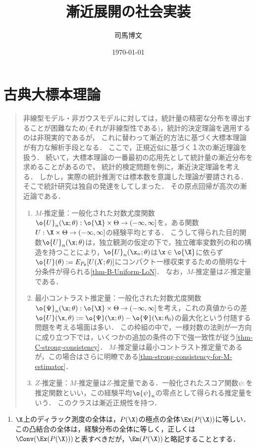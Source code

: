 \documentclass[uplatex,dvipdfmx]{jsreport}
\title{漸近展開の社会実装}
\author{司馬博文}
\date{\today}
\begin{document}
\tableofcontents


\chapter{古典大標本理論}

\begin{quotation}
    非線型モデル・非ガウスモデルに対しては，統計量の精密な分布を導出することが困難なため(それが非線型性である)，統計的決定理論を適用するのは非現実的であるが，
    これに替わって漸近的方法に基づく大標本理論が有力な解析手段となる．
    ここで，正規近似に基づく１次の漸近理論を扱う．
    続いて，大標本理論の一番最初の応用先として統計量の漸近分布を求めることがあるので，
    統計的検定問題を例に，漸近決定理論を考える．
    しかし，実際の統計推測では標本数を意識した理論が要請される．
    そこで統計研究は独自の発達をしてしまった．
    その原点回帰が高次の漸近論である．
    \begin{enumerate}
        \item $M$-推定量：一般化された対数尤度関数$\o{U}_n(\x;\theta):\o{\X}\times\Theta\to(-\infty,\infty]$を，ある関数$U:\X\times\Theta\to(-\infty,\infty]$の経験平均とする．
        こうして得られた目的関数$\o{U}_n(\x;\theta)$は，独立観測の仮定の下で，独立確率変数列の和の構造を持つことにより，$\o{U}_n(\x_n;\theta)$は$\x\in\o{\X}$に依らず$\o{U}(\theta):=E_{P_\theta}[U(X;\theta)]$にコンパクト一様収束するための簡明な十分条件が得られる\ref{thm-B-Uniform-LoN}．
        なお，$M$-推定量は$Z$-推定量である．
        \item 最小コントラスト推定量：一般化された対数尤度関数$\o{\Psi}_n(\x;\theta):\o{\X}\times\Theta\to(-\infty,\infty]$を考え，これの真値からの差$\o{U}(\x,\theta):=\o{\Psi}(\x;\theta)-\o{\Psi}(\x;\theta_0)$の最大化という付随する問題を考える場面は多い．
        この枠組の中で，一様対数の法則が一方向に成り立つ下では，いくつかの追加の条件の下で強一致性が従う\ref{thm-C-strong-consistency}．
        $M$-推定量は最小コントラスト推定量であるが，この場合はさらに明瞭である\ref{thm-strong-consistency-for-M-estimator}．
        \item $Z$-推定量：$M$-推定量は$Z$-推定量である．一般化されたスコア関数$\psi:$を推定関数といい，この経験平均$\o{\psi}_n$の零点として得られる推定量をいう．
        このクラスは漸近正規性を持つ．
    \end{enumerate}
\end{quotation}

\begin{notation}\mbox{}
    \begin{enumerate}
        \item $\X$上のディラック測度の全体は，$P(\X)$の極点の全体$\Ex(P(\X))$に等しい．この凸結合の全体は，経験分布の全体に等しく，正しくは$\Conv(\Ex(P(\X)))$と表すべきだが，$\Em(P(\X))$と略記することとする．
    \end{enumerate}
\end{notation}
\end{document}
